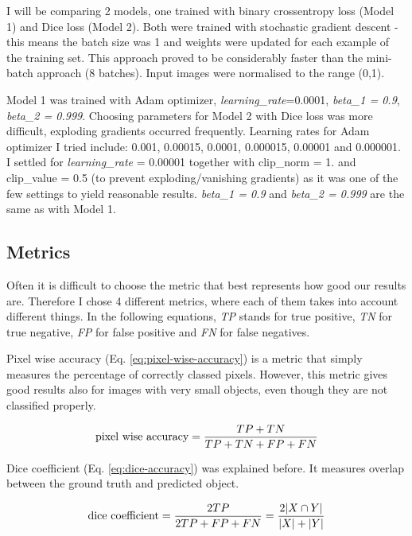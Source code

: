 I will be comparing 2 models, one trained with binary crossentropy loss (Model 1) and Dice loss (Model 2). Both were trained with stochastic gradient descent - this means the batch size was 1 and weights were updated for each example of the training set. This approach proved to be considerably faster than the mini-batch approach (8 batches). Input images were normalised to the range (0,1). 

Model 1 was trained with Adam optimizer, \textit{learning\_rate}=0.0001, \textit{beta\_1 = 0.9}, \textit{beta\_2 = 0.999}. Choosing parameters for Model 2 with Dice loss was more difficult, exploding gradients occurred frequently. Learning rates for Adam optimizer I tried include: 0.001, 0.00015, 0.0001, 0.000015, 0.00001 and 0.000001. I settled for \textit{learning\_rate} = 0.00001 together with clip\_norm = 1. and clip\_value = 0.5 (to prevent exploding/vanishing gradients) as it was one of the few settings to yield reasonable results. \textit{beta\_1 = 0.9} and \textit{beta\_2 = 0.999} are the same as with Model 1.

\subsection{Metrics}
Often it is difficult to choose the metric that best represents how good our results are. Therefore I chose 4 different metrics, where each of them takes into account different things. In the following equations, \textit{TP} stands for true positive, \textit{TN} for true negative, \textit{FP} for false positive and \textit{FN} for false negatives.

Pixel wise accuracy (Eq. \ref{eq:pixel-wise-accuracy}) is a metric that simply measures the percentage of correctly classed pixels. However, this metric gives good results also for images with very small objects, even though they are not classified properly.

\begin{equation}
\label{eq:pixel-wise-accuracy}
    \textup{pixel wise accuracy}  = \frac{TP + TN}{TP + TN + FP + FN} 
\end{equation}

Dice coefficient (Eq. \ref{eq:dice-accuracy}) was explained before. It measures overlap between the ground truth and predicted object. 

\begin{equation}
\label{eq:dice-accuracy}
    \textup{dice coefficient}  = \frac{2TP}{2TP + FP + FN} = \frac{2|X\cap Y|}{|X|+|Y|}
\end{equation}


